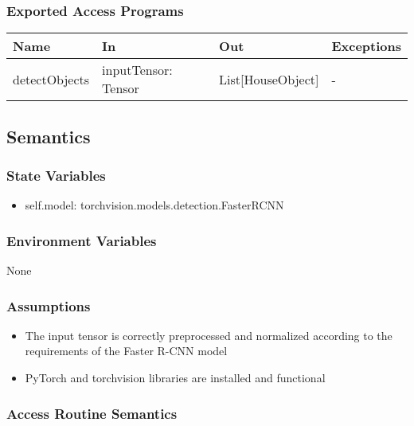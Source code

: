 \documentclass[12pt, titlepage]{article}
\begin{document}
\subsubsection{Exported Access Programs}

\begin{center}
\begin{tabular}{p{4cm} p{4cm} p{4cm} p{3.5cm}}
\hline
\textbf{Name} & \textbf{In} & \textbf{Out} & \textbf{Exceptions} \\
\hline
detectObjects & inputTensor: Tensor & List[HouseObject] & - \\
\hline
\end{tabular}
\end{center}

\subsection{Semantics}

\subsubsection{State Variables}
\begin{itemize}
	\item self.model: torchvision.models.detection.FasterRCNN
\end{itemize}


\subsubsection{Environment Variables}
None

\subsubsection{Assumptions}
\begin{itemize}
  \item The input tensor is correctly preprocessed and normalized according to the requirements of the Faster R-CNN model
  \item PyTorch and torchvision libraries are installed and functional
\end{itemize}


\subsubsection{Access Routine Semantics}
\end{document}

